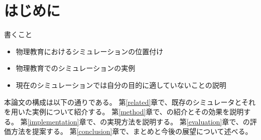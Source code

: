 \chapter{はじめに} \label{first}

書くこと

\begin{itemize}
\item {
  物理教育におけるシミュレーションの位置付け
}
\item {
  物理教育でのシミュレーションの実例
}
\item {
  現在のシミュレーションでは自分の目的に適していないことの説明
}
\end{itemize}

本論文の構成は以下の通りである。
第\ref{related}章で、既存のシミュレータとそれを用いた実例について紹介する。
第\ref{method}章で、\simname の紹介とその効果を説明する。
第\ref{implementation}章で、\simname の実現方法を説明する。
第\ref{evaluation}章で、\simname の評価方法を提案する。
第\ref{conclusion}章で、まとめと今後の展望について述べる。
